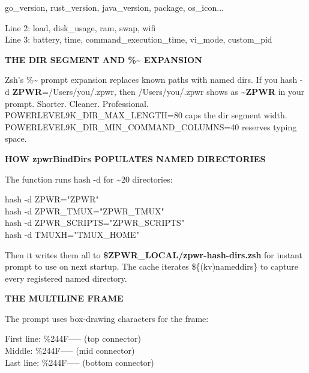 \documentclass[11pt,a4paper,twoside]{book}
\begin{document}
go\_version, rust\_version, java\_version, package, os\_icon...

\begin{codebox}
\color{neongreen}Line 2: load, disk\_usage, ram, swap, wifi\\
\color{neongreen}Line 3: battery, time, command\_execution\_time, vi\_mode, custom\_pid\\
\end{codebox}


\vspace{12pt}
{\bfseries\color{neonyellow} THE DIR SEGMENT AND \%\textasciitilde{} EXPANSION}\vspace{4pt}

Zsh's \%\textasciitilde{} prompt expansion replaces known paths with named dirs. If you hash -d \textbf{ZPWR}=/Users/you/.zpwr, then /Users/you/.zpwr shows as \textasciitilde{}\textbf{ZPWR} in your prompt. Shorter. Cleaner. Professional. POWERLEVEL9K\_DIR\_MAX\_LENGTH=80 caps the dir segment width. POWERLEVEL9K\_DIR\_MIN\_COMMAND\_COLUMNS=40 reserves typing space.


\vspace{12pt}
{\bfseries\color{neonyellow} HOW zpwrBindDirs POPULATES NAMED DIRECTORIES}\vspace{4pt}

The function runs hash -d for \textasciitilde{}20 directories:

\begin{codebox}
\color{neongreen}hash -d ZPWR="ZPWR"\\
\color{neongreen}hash -d ZPWR\_TMUX="ZPWR\_TMUX"\\
\color{neongreen}hash -d ZPWR\_SCRIPTS="ZPWR\_SCRIPTS"\\
\color{neongreen}hash -d TMUXH="TMUX\_HOME"\\
\end{codebox}

Then it writes them all to \textbf{\$ZPWR\_LOCAL/zpwr-hash-dirs.zsh} for instant prompt to use on next startup. The cache iterates \$\{(kv)nameddirs\} to capture every registered named directory.


\vspace{12pt}
{\bfseries\color{neonyellow} THE MULTILINE FRAME}\vspace{4pt}

The prompt uses box-drawing characters for the frame:

\begin{codebox}
\color{neongreen}First line:  \%244F-----  (top connector)\\
\color{neongreen}Middle:      \%244F-----  (mid connector)\\
\color{neongreen}Last line:   \%244F-----  (bottom connector)\\
\end{codebox}
\end{document}

